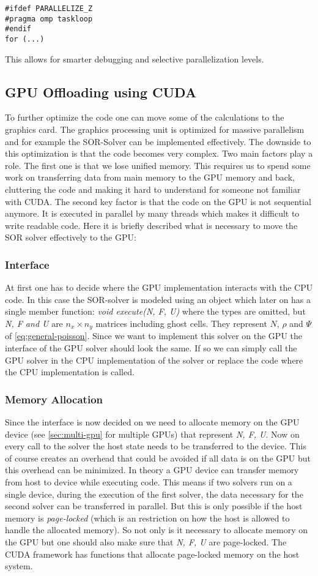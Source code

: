 \documentclass[master.tex]{subfiles}
\begin{document}
\begin{lstlisting}
#ifdef PARALLELIZE_Z
#pragma omp taskloop
#endif
for (...)
\end{lstlisting}
This allows for smarter debugging and selective parallelization levels.

\subsection{GPU Offloading using CUDA}
To further optimize the code one can move some of the calculations to the graphics card. The graphics processing unit is optimized for massive parallelism and for example the SOR-Solver can be implemented effectively. The downside to this optimization is that the code becomes very complex. Two main factors play a role. The first one is that we lose unified memory. This requires us to spend some work on transferring data from main memory to the GPU memory and back, cluttering the code and making it hard to understand for someone not familiar with CUDA. The second key factor is that the code on the GPU is not sequential anymore. It is executed in parallel by many threads which makes it difficult to write readable code.\newline
Here it is briefly described what is necessary to move the SOR solver effectively to the GPU:
\subsubsection{Interface}
At first one has to decide where the GPU implementation interacts with the CPU code. In this case the \ac{SOR}-solver is modeled using an object which later on has a single member function: \textit{void execute(N, F, U)} where the types are omitted, but \textit{N, F and U} are $n_x \times n_y$ matrices including ghost cells. They represent $N$, $\rho$ and $\Psi$ of \autoref{eq:general-poisson}. Since we want to implement this solver on the GPU the interface of the GPU solver should look the same. If so we can simply call the GPU solver in the CPU implementation of the solver or replace the code where the CPU implementation is called.
\subsubsection{Memory Allocation}
Since the interface is now decided on we need to allocate memory on the GPU device (see \autoref{sec:multi-gpu} for multiple GPUs) that represent \textit{N, F, U}. Now on every call to the solver the host state needs to be transferred to the device. This of course creates an overhead that could be avoided if all data is on the GPU but this overhead can be minimized. In theory a GPU device can transfer memory from host to device while executing code. This means if two solvers run on a single device, during the execution of the first solver, the data necessary for the second solver can be transferred in parallel. But this is only possible if the host memory is \textit{page-locked} (which is an restriction on how the host is allowed to handle the allocated memory). So not only is it necessary to allocate memory on the GPU but one should also make sure that \textit{N, F, U} are page-locked. The CUDA framework has functions that allocate page-locked memory on the host system.
\end{document}
